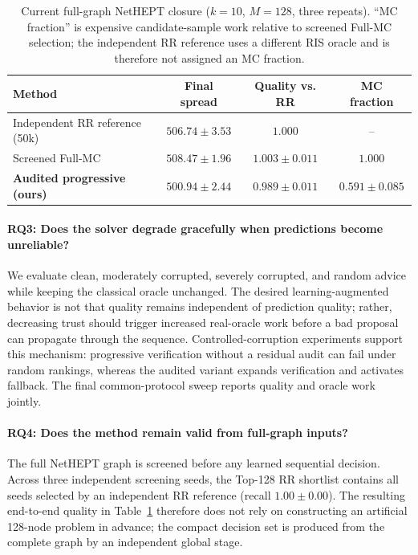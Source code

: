 \begin{table}[t]
\centering
\small
\caption{Current full-graph NetHEPT closure ($k=10$, $M=128$, three repeats). ``MC fraction'' is expensive candidate-sample work relative to screened Full-MC selection; the independent RR reference uses a different RIS oracle and is therefore not assigned an MC fraction.}
\label{tab:fullgraph}
\begin{tabular}{lccc}
\toprule
Method & Final spread & Quality vs. RR & MC fraction \\
\midrule
Independent RR reference (50k) & $506.74\pm3.53$ & $1.000$ & -- \\
Screened Full-MC & $508.47\pm1.96$ & $1.003\pm0.011$ & $1.000$ \\
\textbf{Audited progressive (ours)} & $500.94\pm2.44$ & $0.989\pm0.011$ & $0.591\pm0.085$ \\
\bottomrule
\end{tabular}
\end{table}

\paragraph{RQ3: Does the solver degrade gracefully when predictions become unreliable?}
We evaluate clean, moderately corrupted, severely corrupted, and random advice while keeping the classical oracle unchanged. The desired learning-augmented behavior is not that quality remains independent of prediction quality; rather, decreasing trust should trigger increased real-oracle work before a bad proposal can propagate through the sequence. Controlled-corruption experiments support this mechanism: progressive verification without a residual audit can fail under random rankings, whereas the audited variant expands verification and activates fallback. The final common-protocol sweep reports quality and oracle work jointly.

\paragraph{RQ4: Does the method remain valid from full-graph inputs?}
The full NetHEPT graph is screened before any learned sequential decision. Across three independent screening seeds, the Top-128 RR shortlist contains all seeds selected by an independent RR reference (recall $1.00\pm0.00$). The resulting end-to-end quality in Table~\ref{tab:fullgraph} therefore does not rely on constructing an artificial 128-node problem in advance; the compact decision set is produced from the complete graph by an independent global stage.

